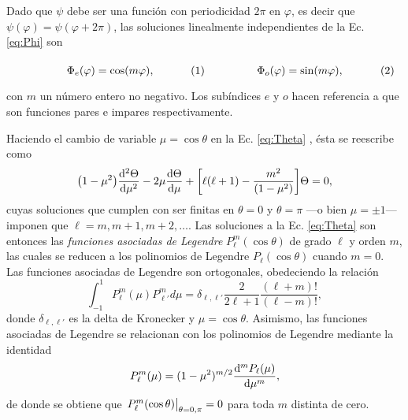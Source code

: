 Dado que $\psi$ debe ser una función con periodicidad $2\pi$ en $\varphi$, es decir que $\psi(\varphi) = \psi(\varphi+2\pi)$, las soluciones linealmente independientes de la Ec. \eqref{eq:Phi} son

	\begin{subequations}
	\eqhalf{\Phi_e(\varphi) = \cos(m\varphi),}
	\eqhalf{\Phi_o(\varphi) = \sin(m\varphi),} 
	\end{subequations}
	
\noindent	
con $m$ un número entero no negativo. Los subíndices $e$ y $o$ hacen referencia a que son funciones pares e impares respectivamente.

Haciendo el cambio de variable $\mu = \cos\theta$ en la Ec. \eqref{eq:Theta} , ésta se reescribe como
	\begin{equation*}
	\qty(1-\mu^2) \dv[2]{\Theta}{\mu} - 2 \mu \dv{\Theta}{\mu} + \qty[\ell(\ell+1)-\frac{m^2}{(1-\mu^2)}]\Theta= 0,
	\end{equation*}
cuyas soluciones que cumplen con ser finitas en $\theta = 0$ y $\theta = \pi$ ---o bien $\mu=\pm1$--- imponen que $\ell = m, m+1,m+2,\ldots$. Las soluciones a la Ec. \eqref{eq:Theta} son entonces las \emph{funciones asociadas de Legendre} $P_\ell^m(\cos\theta)$ de grado $\ell$ y orden $m$, las cuales se reducen a los polinomios de Legendre $P_\ell(\cos\theta)$ cuando $m=0$. Las funciones asociadas de Legendre son ortogonales, obedeciendo la relación
	\begin{equation}
	\int_{-1}^1P_\ell^m(\mu) P_{\ell'}^md\mu = \delta_{\ell,\ell'}\frac{2}{2\ell+1}\frac{(\ell+m)!}{(\ell-m)!},
	\label{eq:ortLegendre}
	\end{equation}
donde $\delta_{\ell,\ell'}$ es la delta de Kronecker y $\mu=\cos\theta$. Asimismo, las funciones asociadas de Legendre se relacionan con los polinomios de Legendre mediante la identidad
	\begin{equation}
	P_\ell^m (\mu) = (1-\mu^2)^{m/2}\dv[m]{P_\ell(\mu)}{\mu},
	\label{eq:FAL-PL}
	\end{equation}
de donde se obtiene que $\eval{P_\ell^m(\cos\theta)}_{\theta=0,\pi}=0$ para toda $m$ distinta de cero. %

